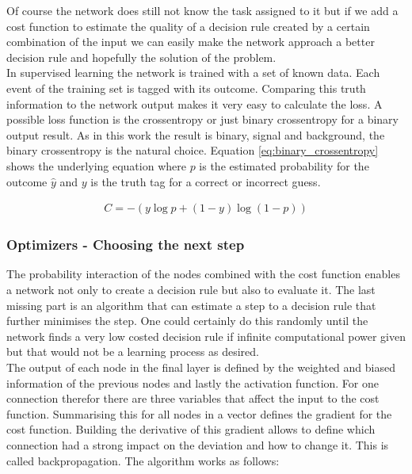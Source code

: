Of course the network does still not know the task assigned to it but if we add a cost function to estimate the quality of a decision rule created by a certain combination of the input we can easily make the network approach a better decision rule and hopefully the solution of the problem.\\
In supervised learning the network is trained with a set of known data. Each event of the training set is tagged with its outcome. Comparing this truth information to the network output makes it very easy to calculate the loss. A possible loss function is the crossentropy or just binary crossentropy for a binary output result. As in this work the result is binary, signal and background, the binary crossentropy is the natural choice. Equation \eqref{eq:binary_crossentropy} shows the underlying equation where $p$ is the estimated probability for the outcome $\hat{y}$ and $y$ is the truth tag for a  correct or incorrect guess.

\begin{align}
    C = -(y \log p + (1 - y) \log (1 - p) )
    \label{eq:binary_crossentropy}
\end{align}

\subsubsection{Optimizers - Choosing the next step}

The probability interaction of the nodes combined with the cost function enables a network not only to create a decision rule but also to evaluate it. The last missing part is an algorithm that can estimate a step to a decision rule that further minimises the step. One could certainly do this randomly until the network finds a very low costed decision rule if infinite computational power given but that would not be a learning process as desired.\\
The output of each node in the final layer is defined by the weighted and biased information of the previous nodes and lastly the activation function. For one connection therefor there are three variables that affect the input to the cost function. Summarising this for all nodes in a vector defines the gradient for the cost function. Building the derivative of this gradient allows to define which connection had a strong impact on the deviation and how to change it. This is called backpropagation. The algorithm works as follows:

